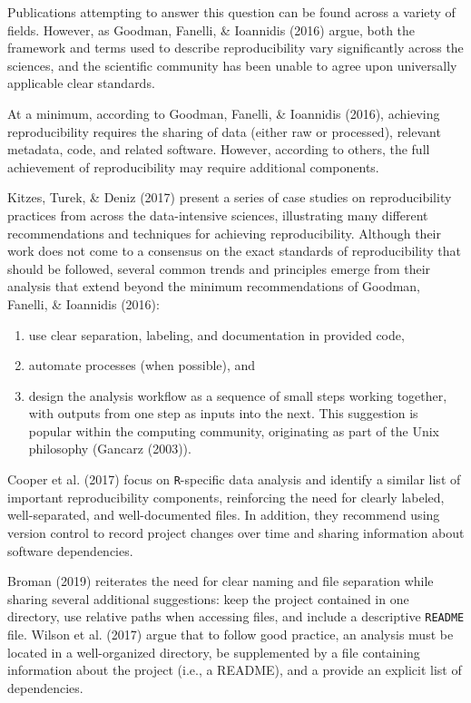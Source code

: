 \documentclass[12pt,twoside]{reedthesis}
\providecommand{\tightlist}{%
  \setlength{\itemsep}{0pt}\setlength{\parskip}{0pt}}
\begin{document}
Publications attempting to answer this question can be found across a variety of fields. However, as Goodman, Fanelli, \& Ioannidis (2016) argue, both the framework and terms used to describe reproducibility vary significantly across the sciences, and the scientific community has been unable to agree upon universally applicable clear standards.

At a minimum, according to Goodman, Fanelli, \& Ioannidis (2016), achieving reproducibility requires the sharing of data (either raw or processed), relevant metadata, code, and related software. However, according to others, the full achievement of reproducibility may require additional components.

Kitzes, Turek, \& Deniz (2017) present a series of case studies on reproducibility practices from across the data-intensive sciences, illustrating many different recommendations and techniques for achieving reproducibility. Although their work does not come to a consensus on the exact standards of reproducibility that should be followed, several common trends and principles emerge from their analysis that extend beyond the minimum recommendations of Goodman, Fanelli, \& Ioannidis (2016):
\begin{enumerate}
\def\labelenumi{\arabic{enumi})}
\tightlist
\item
  use clear separation, labeling, and documentation in provided code,
\item
  automate processes (when possible), and
\item
  design the analysis workflow as a sequence of small steps working together, with outputs from one step as inputs into the next. This suggestion is popular within the computing community, originating as part of the Unix philosophy (Gancarz (2003)).
\end{enumerate}
Cooper et al. (2017) focus on \texttt{R}-specific data analysis and identify a similar list of important reproducibility components, reinforcing the need for clearly labeled, well-separated, and well-documented files. In addition, they recommend using version control to record project changes over time and sharing information about software dependencies.

Broman (2019) reiterates the need for clear naming and file separation while sharing several additional suggestions: keep the project contained in one directory, use relative paths when accessing files, and include a descriptive \texttt{README} file. Wilson et al. (2017) argue that to follow good practice, an analysis must be located in a well-organized directory, be supplemented by a file containing information about the project (i.e., a README), and a provide an explicit list of dependencies.
\end{document}
